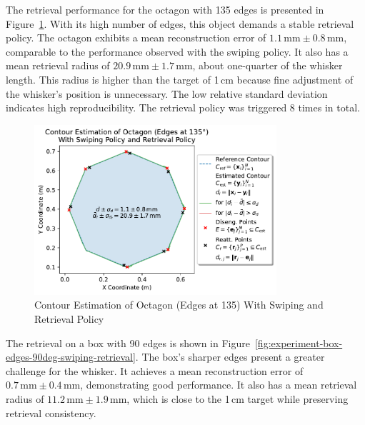 The retrieval performance for the octagon with 135\degree{} edges is presented in Figure~\ref{fig:experiment-octagon-edges-135deg-swiping-retrieval}.
With its high number of edges, this object demands a stable retrieval policy.
The octagon exhibits a mean reconstruction error of $1.1\,\text{mm} \pm 0.8\,\text{mm}$, comparable to the performance observed with the swiping policy.
It also has a mean retrieval radius of $20.9\,\text{mm} \pm 1.7\,\text{mm}$, about one-quarter of the whisker length.
This radius is higher than the target of 1\,cm because fine adjustment of the whisker's position is unnecessary.
The low relative standard deviation indicates high reproducibility.
The retrieval policy was triggered 8 times in total.

\begin{figure}[!htb]
    \centering
    \includegraphics[width=0.8\textwidth]{figures/experiments/octagon-edges-135deg-swiping-retrieval}
    \caption{Contour Estimation of Octagon (Edges at 135\degree{}) With Swiping and Retrieval Policy}
    \label{fig:experiment-octagon-edges-135deg-swiping-retrieval}
\end{figure}

The retrieval on a box with 90\degree{} edges is shown in Figure~\ref{fig:experiment-box-edges-90deg-swiping-retrieval}.
The box's sharper edges present a greater challenge for the whisker.
It achieves a mean reconstruction error of $0.7\,\text{mm} \pm 0.4\,\text{mm}$, demonstrating good performance.
It also has a mean retrieval radius of $11.2\,\text{mm} \pm 1.9\,\text{mm}$, which is close to the 1\,cm target while preserving retrieval consistency.


